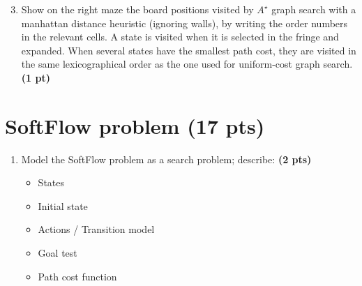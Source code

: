\documentclass[11pt,a4paper]{report}
\begin{document}
\begin{enumerate}
\setcounter{enumi}{2}
\item Show on the right maze the board positions visited by $A^{\star}$ graph search with a manhattan distance heuristic (ignoring walls), by writing the order numbers in the relevant cells. A state is visited when it is selected in the fringe and expanded. When several states have the smallest path cost, they are visited in the same lexicographical order as the one used for uniform-cost graph search. \textbf{(1 pt)}
\end{enumerate}

\begin{answers}[5.2cm]
\begin{center}
\end{center}
\end{answers}




\section{SoftFlow problem (17 pts)}

\begin{enumerate}
  \item Model the SoftFlow problem as a search problem; describe: \textbf{(2 pts)}
		\begin{itemize}
			\item States
			\item Initial state
			\item Actions / Transition model
			\item Goal test
			\item Path cost function
		\end{itemize}
\end{enumerate}
\end{document}
